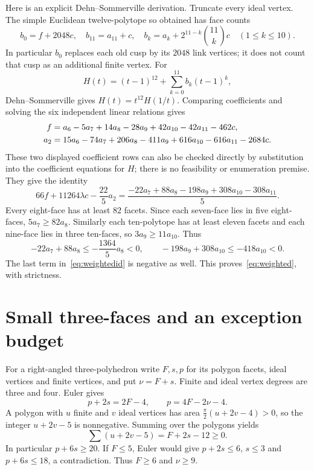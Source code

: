 \documentclass[11pt]{article}
\begin{document}
Here is an explicit Dehn--Sommerville derivation. Truncate every
ideal vertex. The simple Euclidean twelve-polytope so obtained has
face counts
\[
 b_0=f+2048c,\quad b_{11}=a_{11}+c,\quad
 b_k=a_k+2^{11-k}\binom{11}{k}c\quad(1\le k\le10).
\]
In particular $b_0$ replaces each old cusp by its $2048$ link vertices;
it does not count that cusp as an additional finite vertex.
For
\[
 H(t)=(t-1)^{12}+\sum_{k=0}^{11}b_k(t-1)^k,
\]
Dehn--Sommerville gives $H(t)=t^{12}H(1/t)$. Comparing coefficients
and solving the six independent linear relations gives
\begin{align}
 f&=a_6-5a_7+14a_8-28a_9+42a_{10}-42a_{11}-462c,
 \notag\\
 a_2&=15a_6-74a_7+206a_8-411a_9+616a_{10}-616a_{11}-2684c.
 \label{eq:DS}
\end{align}
These two displayed coefficient rows can also be checked directly
by substitution into the coefficient equations for $H$; there is
no feasibility or enumeration premise. They give the identity
\begin{equation}\label{eq:weightedid}
 66f+11264\lambda c-\frac{22}5a_2
 =\frac{-22a_7+88a_8-198a_9+308a_{10}-308a_{11}}5.
\end{equation}
Every eight-face has at least $82$ facets. Since each seven-face
lies in five eight-faces, $5a_7\ge82a_8$. Similarly each
ten-polytope has at least eleven facets and each nine-face lies
in three ten-faces, so $3a_9\ge11a_{10}$. Thus
\[
 -22a_7+88a_8\le-\frac{1364}5a_8<0,\qquad
 -198a_9+308a_{10}\le-418a_{10}<0.
\]
The last term in~\eqref{eq:weightedid} is negative as well.
This proves~\eqref{eq:weighted}, with strictness.

\section{Small three-faces and an exception budget}
For a right-angled three-polyhedron write $F,s,p$ for its polygon
facets, ideal vertices and finite vertices, and put $\nu=F+s$.
Finite and ideal vertex degrees are three and four. Euler gives
\begin{equation}\label{eq:Euler3}
 p+2s=2F-4,\qquad p=4F-2\nu-4.
\end{equation}
A polygon with $u$ finite and $v$ ideal vertices has area
$\frac\pi2(u+2v-4)>0$, so the integer $u+2v-5$ is nonnegative.
Summing over the polygons yields
\begin{equation}\label{eq:excess3}
 \sum(u+2v-5)=F+2s-12\ge0.
\end{equation}
In particular $p+6s\ge20$. If $F\le5$, Euler would give
$p+2s\le6$, $s\le3$ and $p+6s\le18$, a contradiction.
Thus $F\ge6$ and $\nu\ge9$.
\end{document}
